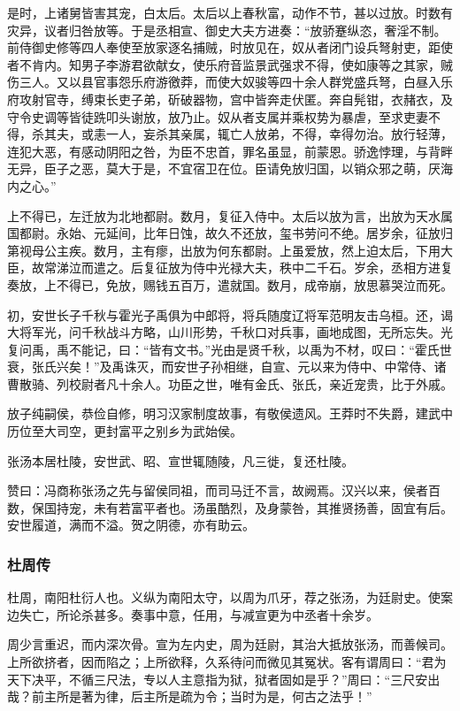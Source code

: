 \documentclass[]{article}
\begin{document}
是时，上诸舅皆害其宠，白太后。太后以上春秋富，动作不节，甚以过放。时数有灾异，议者归咎放等。于是丞相宣、御史大夫方进奏：``放骄蹇纵恣，奢淫不制。前侍御史修等四人奉使至放家逐名捕贼，时放见在，奴从者闭门设兵弩射吏，距使者不肯内。知男子李游君欲献女，使乐府音监景武强求不得，使如康等之其家，贼伤三人。又以县官事怨乐府游徼莽，而使大奴骏等四十余人群党盛兵弩，白昼入乐府攻射官寺，缚束长吏子弟，斫破器物，宫中皆奔走伏匿。奔自髡钳，衣赭衣，及守令史调等皆徒跣叩头谢放，放乃止。奴从者支属并乘权势为暴虐，至求吏妻不得，杀其夫，或恚一人，妄杀其亲属，辄亡人放弟，不得，幸得勿治。放行轻薄，连犯大恶，有感动阴阳之咎，为臣不忠首，罪名虽显，前蒙恩。骄逸悖理，与背畔无异，臣子之恶，莫大于是，不宜宿卫在位。臣请免放归国，以销众邪之萌，厌海内之心。''

上不得已，左迁放为北地都尉。数月，复征入侍中。太后以放为言，出放为天水属国都尉。永始、元延间，比年日蚀，故久不还放，玺书劳问不绝。居岁余，征放归第视母公主疾。数月，主有瘳，出放为何东都尉。上虽爱放，然上迫太后，下用大臣，故常涕泣而遣之。后复征放为侍中光禄大夫，秩中二千石。岁余，丞相方进复奏放，上不得已，免放，赐钱五百万，遣就国。数月，成帝崩，放思慕哭泣而死。

初，安世长子千秋与霍光子禹俱为中郎将，将兵随度辽将军范明友击乌桓。还，谒大将军光，问千秋战斗方略，山川形势，千秋口对兵事，画地成图，无所忘失。光复问禹，禹不能记，曰：``皆有文书。''光由是贤千秋，以禹为不材，叹曰：``霍氏世衰，张氏兴矣！''及禹诛灭，而安世子孙相继，自宣、元以来为侍中、中常侍、诸曹散骑、列校尉者凡十余人。功臣之世，唯有金氏、张氏，亲近宠贵，比于外戚。

放子纯嗣侯，恭俭自修，明习汉家制度故事，有敬侯遗风。王莽时不失爵，建武中历位至大司空，更封富平之别乡为武始侯。

张汤本居杜陵，安世武、昭、宣世辄随陵，凡三徙，复还杜陵。

赞曰：冯商称张汤之先与留侯同祖，而司马迁不言，故阙焉。汉兴以来，侯者百数，保国持宠，未有若富平者也。汤虽酷烈，及身蒙咎，其推贤扬善，固宜有后。安世履道，满而不溢。贺之阴德，亦有助云。

\hypertarget{header-n4689}{%
\subsubsection{杜周传}\label{header-n4689}}

杜周，南阳杜衍人也。义纵为南阳太守，以周为爪牙，荐之张汤，为廷尉史。使案边失亡，所论杀甚多。奏事中意，任用，与减宣更为中丞者十余岁。

周少言重迟，而内深次骨。宣为左内史，周为廷尉，其治大抵放张汤，而善候司。上所欲挤者，因而陷之；上所欲释，久系待问而微见其冤状。客有谓周曰：``君为天下决平，不循三尺法，专以人主意指为狱，狱者固如是乎？''周曰：``三尺安出哉？前主所是著为律，后主所是疏为令；当时为是，何古之法乎！''
\end{document}
